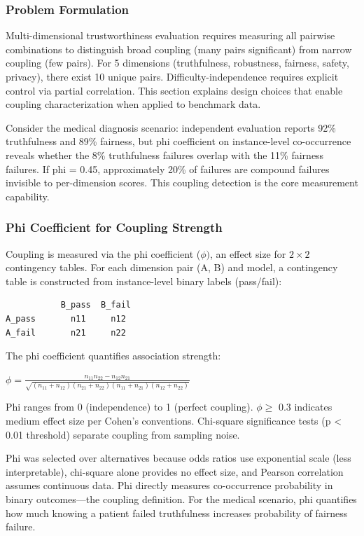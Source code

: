 
\subsubsection{Problem Formulation}

Multi-dimensional trustworthiness evaluation requires measuring all pairwise combinations to distinguish broad coupling (many pairs significant) from narrow coupling (few pairs). For 5 dimensions (truthfulness, robustness, fairness, safety, privacy), there exist 10 unique pairs. Difficulty-independence requires explicit control via partial correlation. This section explains design choices that enable coupling characterization when applied to benchmark data.

Consider the medical diagnosis scenario: independent evaluation reports 92\% truthfulness and 89\% fairness, but phi coefficient on instance-level co-occurrence reveals whether the 8\% truthfulness failures overlap with the 11\% fairness failures. If phi = 0.45, approximately 20\% of failures are compound failures invisible to per-dimension scores. This coupling detection is the core measurement capability.

\subsubsection{Phi Coefficient for Coupling Strength}

Coupling is measured via the phi coefficient ($\phi )$, an effect size for $2\times 2$ contingency tables. For each dimension pair (A, B) and model, a contingency table is constructed from instance-level binary labels (pass/fail):

\begin{verbatim}
           B_pass  B_fail
A_pass       n11     n12
A_fail       n21     n22
\end{verbatim}

The phi coefficient quantifies association strength:

$\phi = \frac{n_{11}n_{22} - n_{12}n_{21}}{\sqrt{(n_{11}+n_{12})(n_{21}+n_{22})(n_{11}+n_{21})(n_{12}+n_{22})}}$

Phi ranges from 0 (independence) to 1 (perfect coupling). $\phi \geq$ 0.3 indicates medium effect size per Cohen's conventions. Chi-square significance tests (p < 0.01 threshold) separate coupling from sampling noise.

Phi was selected over alternatives because odds ratios use exponential scale (less interpretable), chi-square alone provides no effect size, and Pearson correlation assumes continuous data. Phi directly measures co-occurrence probability in binary outcomes---the coupling definition. For the medical scenario, phi quantifies how much knowing a patient failed truthfulness increases probability of fairness failure.

